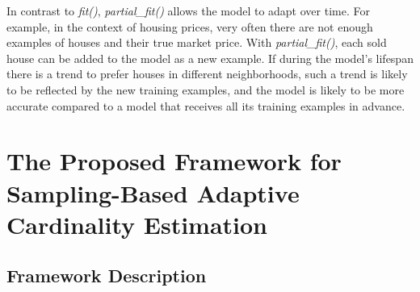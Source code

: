 		In contrast to \emph{fit()}, \emph{partial\_fit()} allows the model to adapt over time. For example, in the context of housing prices, very often there are not enough examples of houses and their true market price. With \emph{partial\_fit()}, each sold house can be added to the model as a new example. If during the model's lifespan there is a trend to prefer houses in different neighborhoods, such a trend is likely to be reflected by the new training examples, and the model is likely to be more accurate compared to a model that receives all its training examples in advance.

\section{The Proposed Framework for Sampling-Based Adaptive Cardinality Estimation} \label{sec:framework}

	\subsection{Framework Description}

